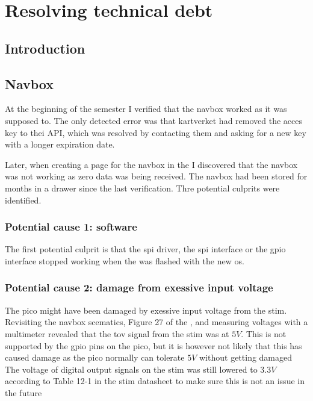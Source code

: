 \chapter{Resolving technical debt}

\section{Introduction}



\label{chap:fixes}
\section{Navbox}
At the beginning of the semester I verified that the \gls{navbox} worked as it was supposed to.
The only detected error was that \gls{kartverket} had removed the acces key to thei API,
which was resolved by contacting them and asking for a new key with a longer expiration date.

Later, when creating a page for the \gls{navbox} in the \srgui I discovered that the \gls{navbox} was not working as zero data was being received.
The \gls{navbox} had been stored for months in a drawer since the last verification.
Thre potential culprits were identified.

\subsection{Potential cause 1: \jx software}
The first potential culprit is that the \gls{spi} driver, the \gls{spi} \py interface or the \gls{gpio} interface stopped working when the \jx was flashed with the new \gls{os}.

\subsection{Potential cause 2: damage from exessive input voltage}
The \gls{pico} might have been damaged by exessive input voltage from the \gls{stim}.
Revisiting the \gls{navbox} scematics, Figure 27 of the \preproject, and measuring voltages with a multimeter revealed that the \gls{tov} signal from the \gls{stim} was at $5V$.
This is not supported by the \gls{gpio} pins on the \gls{pico}, but it is however not likely that this has caused damage as the \gls{pico} normally can tolerate $5V$ without getting damaged \cite[17]{PicoDatasheet}\cite{aryavoronovaRP20405VLogic2023}
The voltage of digital output signals on the \gls{stim} was still lowered to $3.3V$ according to Table 12-1 in the \gls{stim} datasheet to make sure this is not an issue in the future \cite[118]{safranSTIM300Datasheet}

